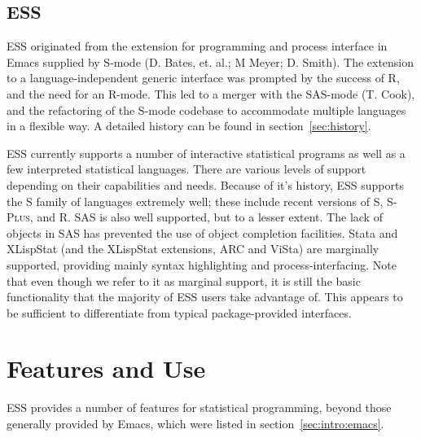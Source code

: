 \documentclass{article}
\newcommand*{\Splus}{\textsc{S-Plus}}
\begin{document}
\subsection{ESS}
\label{sec:UI:ESS}

ESS originated from the extension for programming and process
interface in Emacs supplied by S-mode (D. Bates, et. al.; M Meyer; D.
Smith).  The extension to a language-independent generic interface was
prompted by the success of R, and the need for an R-mode.  This led to
a merger with the SAS-mode (T. Cook), and the refactoring of the
S-mode codebase to accommodate multiple languages in a flexible way.
A detailed history can be found in section~\ref{sec:history}.

ESS currently supports a number of interactive statistical programs as
well as a few interpreted statistical languages.  There are various
levels of support depending on their capabilities and needs.  Because
of it's history, ESS supports the S family of languages extremely
well; these include recent versions of S, \Splus, and R.  SAS is also
well supported, but to a lesser extent.  The lack of objects in SAS
has prevented the use of object completion facilities.  Stata and
XLispStat (and the XLispStat extensions, ARC and ViSta) are marginally
supported, providing mainly syntax highlighting and
process-interfacing.  Note that even though we refer to it as marginal
support, it is still the basic functionality that the majority of ESS
users take advantage of.  This appears to be sufficient to
differentiate from typical package-provided interfaces.

\section{Features and Use}
\label{sec:basic}


ESS provides a number of features for statistical programming, beyond
those generally provided by Emacs, which were listed in
section~\ref{sec:intro:emacs}.
\end{document}
